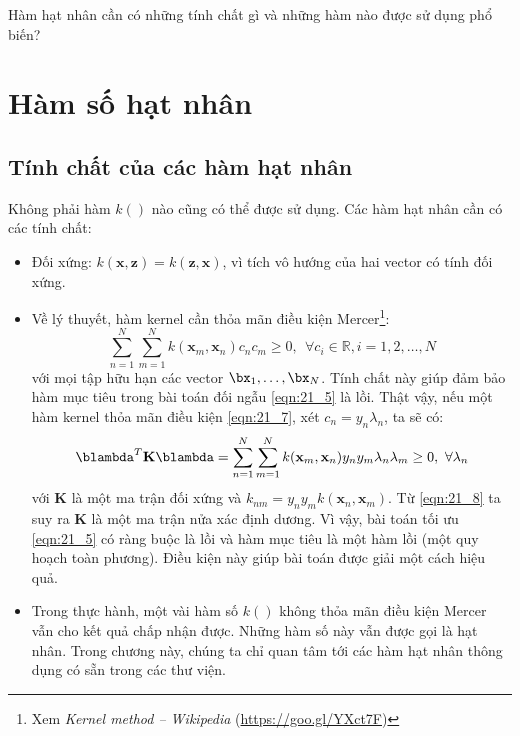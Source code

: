Hàm hạt nhân cần có những tính chất gì và những hàm nào được sử dụng phổ biến?  
 
\section{Hàm số hạt nhân}
\label{sec:21_kernelfns}
 
\subsection{Tính chất của các hàm hạt nhân }
Không phải hàm $k()$ nào cũng có thể được sử dụng. Các hàm hạt nhân cần có các tính chất: 
\begin{itemize}
    \item Đối xứng: $k(\mathbf{x}, \mathbf{z}) = k(\mathbf{z}, \mathbf{x})$, vì
    tích vô hướng của hai vector có tính đối xứng. 
     
    \item {Về lý thuyết}, hàm kernel cần thỏa mãn điều kiện
    Mercer\footnote{Xem \textit{Kernel method -- Wikipedia}
    (\url{https://goo.gl/YXct7F})}:
    \begin{equation} 
    \label{eqn:21_7}
    \sum_{n=1}^N \sum_{m=1}^N k(\mathbf{x}_m, \mathbf{x}_n) c_nc_m \geq 0, ~~ \forall c_i \in \mathbb{R}, i = 1, 2, \dots, N 
    \end{equation} 
    với mọi tập hữu hạn các vector $\bx_1, \dots, \bx_N$. 
    Tính chất này giúp đảm bảo hàm mục tiêu trong bài toán đối ngẫu
    \eqref{eqn:21_5} là {lồi}. Thật vậy, nếu một hàm kernel thỏa mãn điều
    kiện \eqref{eqn:21_7}, xét $c_n = y_n \lambda_n$, ta sẽ có:  
    \begin{equation} 
    \label{eqn:21_8}
    \blambda^T \mathbf{K} \blambda = \sum_{n=1}^N \sum_{m=1}^N k(\mathbf{x}_m, \mathbf{x}_n) y_ny_m \lambda_n \lambda_m \geq 0, ~\forall \lambda_n 
    \end{equation} 
    với $\mathbf{K}$ là một ma trận đối xứng và $ k_{nm} = y_ny_m k(\mathbf{x}_n, \mathbf{x}_m) $.
    Từ \eqref{eqn:21_8} ta suy ra $\mathbf{K}$ là một ma trận nửa xác định dương. Vì vậy, bài toán tối ưu \eqref{eqn:21_5} có ràng buộc là lồi và hàm mục tiêu là một hàm lồi (một quy hoạch toàn phương). Điều kiện này giúp bài toán được giải một cách hiệu quả.  

    \item {Trong thực hành}, một vài hàm số $k()$ không thỏa mãn điều
    kiện Mercer vẫn cho kết quả chấp nhận được. Những hàm số này vẫn được
    gọi là hạt nhân. Trong chương này, chúng ta chỉ quan tâm tới các hàm
    hạt nhân thông dụng có sẵn trong các thư viện.
\end{itemize}
 
